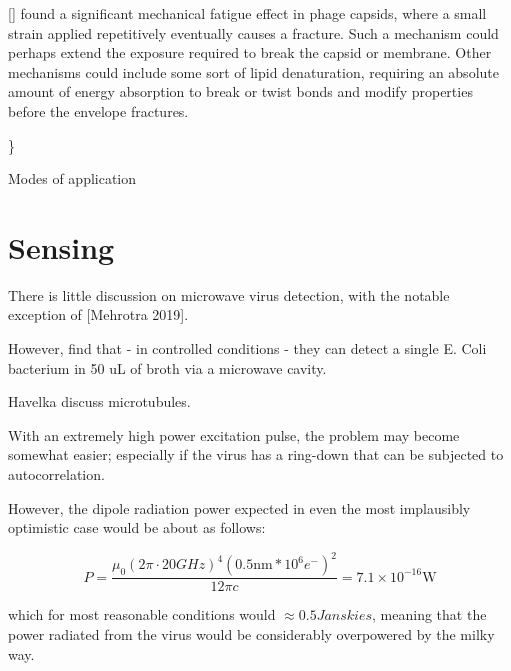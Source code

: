 \documentclass[fleqn,10pt]{article}
\begin{document}
[] found a significant mechanical fatigue effect in phage capsids, where a small strain applied repetitively eventually causes a fracture. Such a mechanism could perhaps extend the exposure required to break the capsid or membrane. Other mechanisms could include some sort of lipid denaturation, requiring an absolute amount of energy absorption to break or twist bonds and modify properties before the envelope fractures.


{\color{red}  \} } 




\clearpage





































\clearpage
\begin{multicols}{1}
{\Large Modes of application}\\

\section{Sensing}

There is little discussion on microwave virus detection, with the notable exception of [Mehrotra 2019]. 

However, \cite{Microwave2012} find that - in controlled conditions - they can detect a single E. Coli bacterium in 50 uL of broth via a microwave cavity. 

Havelka \cite{Highfrequency2011} discuss microtubules.

With an extremely high power excitation pulse, the problem may become somewhat easier; especially if the virus has a ring-down that can be subjected to autocorrelation.

However, the dipole radiation power expected in even the most implausibly optimistic case would be about as follows:

$$P={\frac {\mu _{0}(2 \pi \cdot 20 GHz) ^{4}(0.5 \text{nm} * 10^6 e^-)^{2}}{12\pi c}} = 7.1 \times10^{-16} \text{W} $$

which for most reasonable conditions would $\approx 0.5 Janskies$, meaning that the power radiated from the virus would be considerably overpowered by the milky way.




\end{multicols}
\end{document}
